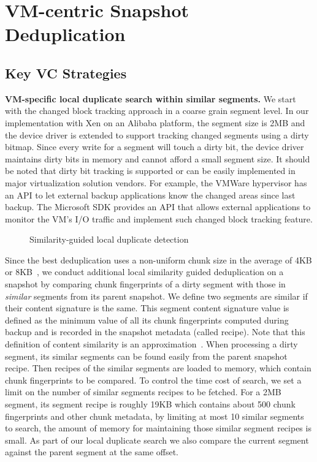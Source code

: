 \section{VM-centric Snapshot Deduplication}
\label{sect:deduplication}

\subsection{Key VC  Strategies}
\label{sect:vc-strategies}
\textbf{VM-specific local duplicate search within similar segments.}
We start with the changed block tracking approach in a coarse grain segment level.
In our implementation with Xen on an Alibaba platform, the segment size is 2MB
and the device driver is extended to support tracking changed segments using a dirty bitmap. 
Since every write for a segment will touch a dirty bit, the device driver maintains dirty bits in memory
and cannot afford a small segment size.
It should be noted that dirty bit tracking is supported or can be easily implemented in 
major virtualization solution vendors. For example,
the VMWare hypervisor has an API to let external backup applications know 
the changed areas since last backup. 
The Microsoft SDK provides an API that allows external applications to monitor 
the VM's I/O traffic and implement such changed block tracking feature.

\begin{figure}[htbp]
  \centering
  \caption{Similarity-guided local duplicate detection}
  \label{fig:local_dedup}
\end{figure}

Since the best deduplication uses a non-uniform chunk size 
in the average of 4KB or 8KB~\cite{Jin2009},
we conduct additional local similarity guided deduplication on a snapshot by comparing
chunk fingerprints of a dirty segment 
with those in  {\em similar} segments from its parent snapshot. 
We define two segments are similar if their content signature is the same.
This segment content signature value is defined as the minimum value of all its chunk fingerprints 
computed during backup and is recorded in the snapshot metadata (called recipe). Note that this definition of
content similarity is an approximation~\cite{resemblance97}.  When processing a dirty segment,
its  similar segments can be found easily from the
parent snapshot recipe.  Then recipes of the similar segments are loaded to memory,
which contain chunk fingerprints to be compared.
To control the time cost of search, we set a limit on the number of  similar segments recipes to be fetched. 
For a 2MB segment, its segment recipe is roughly 19KB which contains about 500 chunk fingerprints and other chunk metadata,
by limiting at most 10 similar segments to search, the amount of memory for maintaining those similar segment recipes is small.
As part of our local duplicate search we also compare the current segment
against the parent segment at the same offset.


